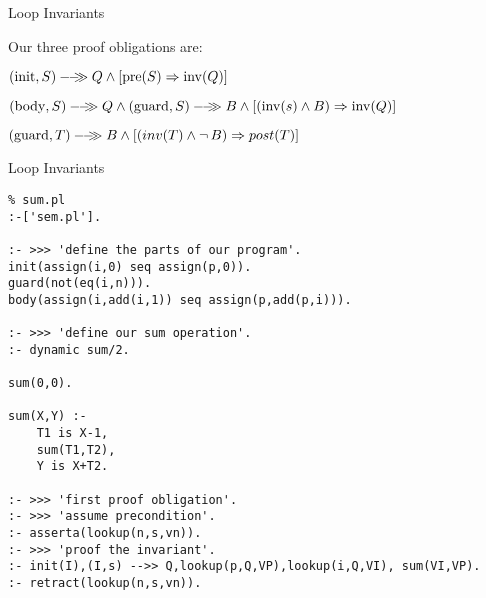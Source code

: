 \documentclass{beamer}
\begin{document}
\begin{frame}[fragile]{Loop Invariants}

\small
Our three proof obligations are:


\vspace{.1in}

${({\rm init},S)}-\!\!-\!\!\!\!\gg{Q} \wedge [{\rm pre}(S)\Rightarrow {\rm inv}(Q)]$

\vspace{.05in}

$\sem{({\rm body},S)}{Q} \wedge \sem{({\rm guard},S)}{B} \wedge [({\rm inv}(s) \wedge B)\Rightarrow {\rm inv}(Q)]$


\vspace{.05in}

${({\rm guard},T)}-\!\!-\!\!\!\!\gg{B} \wedge [(inv(T) \wedge \neg\,B) \Rightarrow post(T)]$

\end{frame}



\begin{frame}[fragile]{Loop Invariants}

{\scriptsize
\begin{verbatim}
% sum.pl
:-['sem.pl'].

:- >>> 'define the parts of our program'.
init(assign(i,0) seq assign(p,0)).
guard(not(eq(i,n))).
body(assign(i,add(i,1)) seq assign(p,add(p,i))).

:- >>> 'define our sum operation'.
:- dynamic sum/2.

sum(0,0).

sum(X,Y) :-
    T1 is X-1,
    sum(T1,T2),
    Y is X+T2.

:- >>> 'first proof obligation'.
:- >>> 'assume precondition'.
:- asserta(lookup(n,s,vn)).                                                                        
:- >>> 'proof the invariant'.                                                                      
:- init(I),(I,s) -->> Q,lookup(p,Q,VP),lookup(i,Q,VI), sum(VI,VP).
:- retract(lookup(n,s,vn)).                                                                        
\end{verbatim}
}
\end{frame}
\end{document}
